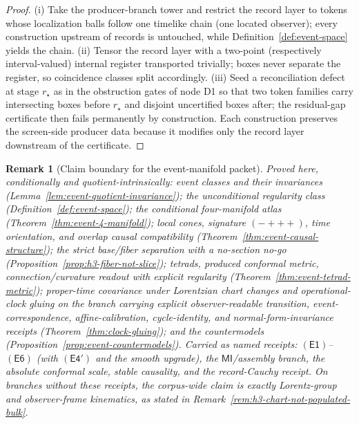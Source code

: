 \documentclass[11pt]{article}
\newtheorem{remark}[theorem]{Remark}
\begin{document}
\begin{proof}
(i) Take the producer-branch tower and restrict the record layer to tokens
whose localization balls follow one timelike chain (one located observer);
every construction upstream of records is untouched, while
Definition~\ref{def:event-space} yields the chain. (ii) Tensor the record
layer with a two-point (respectively interval-valued) internal register
transported trivially; boxes never separate the register, so coincidence
classes split accordingly. (iii) Seed a reconciliation defect at stage
\(r_\star\) as in the obstruction gates of node D1 so that two token families
carry intersecting boxes before \(r_\star\) and disjoint uncertified boxes
after; the residual-gap certificate then fails permanently by construction.
Each construction preserves the screen-side producer data because it modifies
only the record layer downstream of the certificate.
\end{proof}

\begin{remark}[Claim boundary for the event-manifold packet]
\label{rem:event-manifold-claim-boundary}
Proved here, conditionally and quotient-intrinsically: event classes and
their invariances (Lemma~\ref{lem:event-quotient-invariance}); the
unconditional regularity class (Definition~\ref{def:event-space}); the
conditional four-manifold atlas (Theorem~\ref{thm:event-4-manifold}); local
cones, signature \((-{+}{+}{+})\), time orientation, and overlap causal
compatibility (Theorem~\ref{thm:event-causal-structure}); the strict
base/fiber separation with a no-section no-go
(Proposition~\ref{prop:h3-fiber-not-slice}); tetrads, produced conformal
metric, connection/curvature readout with explicit regularity
(Theorem~\ref{thm:event-tetrad-metric}); proper-time covariance under Lorentzian
chart changes and operational-clock gluing on the branch carrying explicit
observer-readable transition, event-correspondence, affine-calibration,
cycle-identity, and normal-form-invariance receipts
(Theorem~\ref{thm:clock-gluing}); and the countermodels
(Proposition~\ref{prop:event-countermodels}). Carried as named receipts:
\(\mathsf{(E1)}\)--\(\mathsf{(E6)}\) (with \(\mathsf{(E4')}\) and the smooth
upgrade), the \(\mathsf{MI}\)/assembly branch, the absolute conformal scale,
stable causality, and the record-Cauchy receipt. On branches without these
receipts, the corpus-wide claim is exactly Lorentz-group and observer-frame
kinematics, as stated in Remark~\ref{rem:h3-chart-not-populated-bulk}.
\end{remark}
\end{document}
